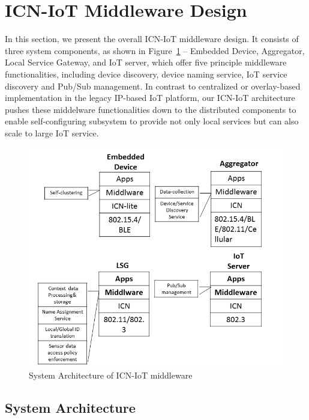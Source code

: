 \section{ICN-IoT Middleware Design}
In this section, we present the overall ICN-IoT middleware design. It consists of three system components, as shown in Figure~\ref{fig:phy} --  Embedded Device, Aggregator, Local Service Gateway, and IoT server, which offer five principle middleware functionalities, including device discovery, device naming service, IoT service discovery and Pub/Sub management.
In contrast to centralized or overlay-based implementation in the legacy IP-based IoT platform, our ICN-IoT architecture pushes these middelware functionalities down to the distributed components to enable self-configuring subsystem to provide not only local services but can also scale to large IoT service.
\begin{figure}
\includegraphics[width=\columnwidth]{figure/physical_comp.png}
\caption{\label{fig:phy}System Architecture of ICN-IoT middleware}
\end{figure}

\subsection{System Architecture}\label{sec:physical}

